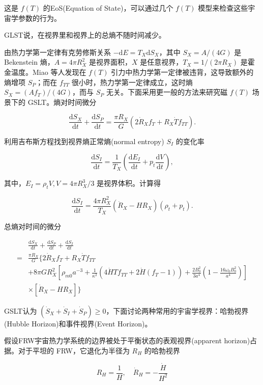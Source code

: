 \documentclass[aps,prl,preprint,groupedaddress]{revtex4-2}
\begin{document}
这是 $f(T)$ 的EoS(Equation of State)，可以通过几个 $f(T)$ 模型来检查这些宇宙学参数的行为。

GLST说，在视界里和视界上的总熵不随时间减少。

由热力学第一定律有克劳修斯关系 $-\mathrm{d}E=T_X\mathrm{d}S_X$，其中 $S_X=A/(4G)$ 是 Bekenstein 熵，$A=4\pi R_X^2$ 是视界面积，$X$ 是任意视界，$T_X=1/(2\pi R_X)$ 是霍金温度。Miao 等人发现在 $f(T)$ 引力中热力学第一定律被违背，这导致额外的熵增项 $S_P$；而在 $f_{TT}$ 很小时，热力学第一定律成立，这时熵 $S_X=(Af_T)/(4G)$，而与 $S_P$ 无关。下面采用更一般的方法来研究磁 $f(T)$ 场景下的 GSLT。熵对时间微分

$$
\frac{\mathrm{d}S_X }{\mathrm{d}t } + \frac{\mathrm{d}S_P }{\mathrm{d}t } = \frac{\pi R_X }{G } \left(2\dot{R}_X f_T + R_X\dot{T} f_{TT} \right).
$$

利用吉布斯方程找到视界熵正常熵(normal entropy) $S_I$ 的变化率

$$
\frac{\mathrm{d}S_I }{\mathrm{d}t } 
=\frac{1 }{T_X } \left(\frac{\mathrm{d}E_I }{\mathrm{d}t } + p_t\frac{\mathrm{d}V }{\mathrm{d}t }  \right),
$$

其中，$E_I=\rho_t V,V=4\pi R_X^3/3$ 是视界体积。计算得

$$
\frac{\mathrm{d}S_I }{\mathrm{d}t } 
=\frac{4\pi R_X^2 }{T_X } \left(\dot{R}_X - H R_X \right)\left(\rho_t+p_t \right).
$$

总熵对时间的微分

$$
\begin{aligned}
    &\frac{\mathrm{d}S_X }{\mathrm{d}t } + \frac{\mathrm{d}S_P }{\mathrm{d}t } + \frac{\mathrm{d}S_I }{\mathrm{d}t } \\
    =&\frac{\pi R_X }{G } \bigg\{2\dot{R}_X f_T + R_X\dot{T}f_{TT} \\
    &+ 8\pi G R_X^2 \left[\rho_{m0}a^{-3} + \frac{1 }{\kappa^2 } \left(4\dot{H} T f_{TT} + 2\dot{H}\left(f_T-1 \right) \right) + \frac{2B_0^2 }{3a^4 } \left(1-\frac{16\omega_0 B_0^2 }{a^4 }  \right) \right] \\
    &\times \left[\dot{R}_X - H R_X \right] \bigg\}
\end{aligned}
$$

GSLT认为 $(\dot{S}_X+\dot{S}_I+\dot{S}_P)\geq 0$，下面讨论两种常用的宇宙学视界：哈勃视界(Hubble Horizon)和事件视界(Event Horizon)。

假设FRW宇宙热力学系统的边界被处于平衡状态的表观视界(apparent horizon)占据。对于平坦的 FRW，它退化为半径为 $R_H$ 的哈勃视界

$$
R_H = \frac{1 }{H } ,\quad
\dot{R}_H = -\frac{\dot{H} }{H^2 }
$$
\end{document}
